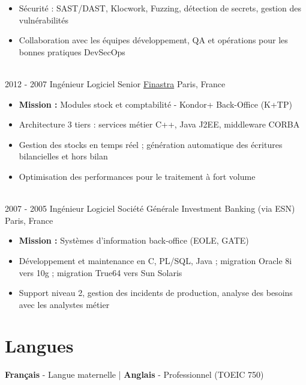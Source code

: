\documentclass[letterpaper]{twentysecondcv} %
\begin{document}
\begin{twentytimeline}
{\begin{itemize}
		\item Sécurité : SAST/DAST, Klocwork, Fuzzing, détection de secrets, gestion des vulnérabilités
		\item Collaboration avec les équipes développement, QA et opérations pour les bonnes pratiques DevSecOps
		\end{itemize}}
	\\
	\twentyitemtimeline{\faCode}
		{2012 -}
		{2007}
		{Ingénieur Logiciel Senior}
		{\href{https://finastra.com}{Finastra}}
		{Paris, France}
		{\begin{itemize}
		\item \textbf{Mission :} Modules stock et comptabilité - Kondor+ Back-Office (K+TP)
		\item Architecture 3 tiers : services métier C++, Java J2EE, middleware CORBA
		\item Gestion des stocks en temps réel ; génération automatique des écritures bilancielles et hors bilan
		\item Optimisation des performances pour le traitement à fort volume
		\end{itemize}}
	\\
	\twentyitemtimeline{\faBriefcase}
		{2007 -}
		{2005}
		{Ingénieur Logiciel}
		{Société Générale Investment Banking (via ESN)}
		{Paris, France}
		{\begin{itemize}
		\item \textbf{Mission :} Systèmes d'information back-office (EOLE, GATE)
		\item Développement et maintenance en C, PL/SQL, Java ; migration Oracle 8i vers 10g ; migration True64 vers Sun Solaris
		\item Support niveau 2, gestion des incidents de production, analyse des besoins avec les analystes métier
		\end{itemize}}
\end{twentytimeline}


\section{Langues}

\textbf{Français} - Langue maternelle | \textbf{Anglais} - Professionnel (TOEIC 750)

\end{document}
